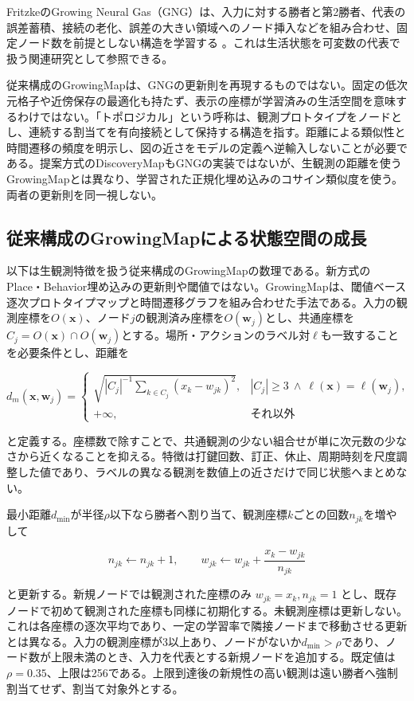FritzkeのGrowing Neural Gas（GNG）は、入力に対する勝者と第2勝者、代表の誤差蓄積、接続の老化、誤差の大きい領域へのノード挿入などを組み合わせ、固定ノード数を前提としない構造を学習する \autocite{fritzke1995gng}。これは生活状態を可変数の代表で扱う関連研究として参照できる。

従来構成のGrowingMapは、GNGの更新則を再現するものではない。固定の低次元格子や近傍保存の最適化も持たず、表示の座標が学習済みの生活空間を意味するわけではない。「トポロジカル」という呼称は、観測プロトタイプをノードとし、連続する割当てを有向接続として保持する構造を指す。距離による類似性と時間遷移の頻度を明示し、図の近さをモデルの定義へ逆輸入しないことが必要である。提案方式のDiscoveryMapもGNGの実装ではないが、生観測の距離を使うGrowingMapとは異なり、学習された正規化埋め込みのコサイン類似度を使う。両者の更新則を同一視しない。

\subsection{従来構成のGrowingMapによる状態空間の成長}
\label{sec:legacy-growingmap}

以下は生観測特徴を扱う従来構成のGrowingMapの数理である。新方式のPlace・Behavior埋め込みの更新則や閾値ではない。GrowingMapは、閾値ベース逐次プロトタイプマップと時間遷移グラフを組み合わせた手法である。入力の観測座標を\(O(\boldsymbol{x})\)、ノード\(j\)の観測済み座標を\(O(\boldsymbol{w}_j)\)とし、共通座標を\(C_j=O(\boldsymbol{x})\cap O(\boldsymbol{w}_j)\)とする。場所・アクションのラベル対\(\ell\)も一致することを必要条件とし、距離を

\[
d_m(\boldsymbol{x},\boldsymbol{w}_j)=
\begin{cases}
\sqrt{|C_j|^{-1}\displaystyle\sum_{k\in C_j}(x_k-w_{jk})^2},
& |C_j|\ge3\ \land\ \ell(\boldsymbol{x})=\ell(\boldsymbol{w}_j),\\
+\infty,&\text{それ以外}
\end{cases}
\]

と定義する。座標数で除すことで、共通観測の少ない組合せが単に次元数の少なさから近くなることを抑える。特徴は打鍵回数、訂正、休止、周期時刻を尺度調整した値であり、ラベルの異なる観測を数値上の近さだけで同じ状態へまとめない。

最小距離\(d_{\min}\)が半径\(\rho\)以下なら勝者へ割り当て、観測座標\(k\)ごとの回数\(n_{jk}\)を増やして

\[
n_{jk}\leftarrow n_{jk}+1,\qquad
w_{jk}\leftarrow w_{jk}
+\frac{x_k-w_{jk}}{n_{jk}}
\]

と更新する。新規ノードでは観測された座標のみ \(w_{jk}=x_k, n_{jk}=1\) とし、既存ノードで初めて観測された座標も同様に初期化する。未観測座標は更新しない。これは各座標の逐次平均であり、一定の学習率で隣接ノードまで移動させる更新とは異なる。入力の観測座標が3以上あり、ノードがないか\(d_{\min}>\rho\)であり、ノード数が上限未満のとき、入力を代表とする新規ノードを追加する。既定値は\(\rho=0.35\)、上限は256である。上限到達後の新規性の高い観測は遠い勝者へ強制割当てせず、割当て対象外とする。

